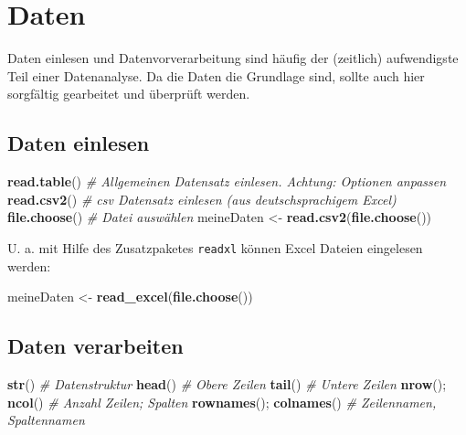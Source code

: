 \documentclass[12pt,ngerman,paper=a4,pagesize,DIV=13]{scrreprt}
\newenvironment{Shaded}{\begin{snugshade}}{\end{snugshade}}
\newcommand{\CommentTok}[1]{\textcolor[rgb]{0.56,0.35,0.01}{\textit{#1}}}
\newcommand{\KeywordTok}[1]{\textcolor[rgb]{0.13,0.29,0.53}{\textbf{#1}}}
\newcommand{\NormalTok}[1]{#1}
\newcommand{\StringTok}[1]{\textcolor[rgb]{0.31,0.60,0.02}{#1}}
\begin{document}
\hypertarget{daten}{%
\section{Daten}\label{daten}}

Daten einlesen und Datenvorverarbeitung sind häufig der (zeitlich)
aufwendigste Teil einer Datenanalyse. Da die Daten die Grundlage sind,
sollte auch hier sorgfältig gearbeitet und überprüft werden.

\hypertarget{daten-einlesen}{%
\subsection{Daten einlesen}\label{daten-einlesen}}

\begin{Shaded}
\begin{Highlighting}[]
\KeywordTok{read.table}\NormalTok{() }\CommentTok{# Allgemeinen Datensatz einlesen. Achtung: Optionen anpassen}
\KeywordTok{read.csv2}\NormalTok{() }\CommentTok{# csv Datensatz einlesen (aus deutschsprachigem Excel)}
\KeywordTok{file.choose}\NormalTok{() }\CommentTok{# Datei auswählen}
\NormalTok{meineDaten <-}\StringTok{ }\KeywordTok{read.csv2}\NormalTok{(}\KeywordTok{file.choose}\NormalTok{())}
\end{Highlighting}
\end{Shaded}

U. a. mit Hilfe des Zusatzpaketes \texttt{readxl} können Excel Dateien
eingelesen werden:

\begin{Shaded}
\begin{Highlighting}[]
\NormalTok{meineDaten <-}\StringTok{ }\KeywordTok{read_excel}\NormalTok{(}\KeywordTok{file.choose}\NormalTok{()) }
\end{Highlighting}
\end{Shaded}

\hypertarget{daten-verarbeiten}{%
\subsection{Daten verarbeiten}\label{daten-verarbeiten}}

\begin{Shaded}
\begin{Highlighting}[]
\KeywordTok{str}\NormalTok{() }\CommentTok{# Datenstruktur}
\KeywordTok{head}\NormalTok{() }\CommentTok{# Obere Zeilen}
\KeywordTok{tail}\NormalTok{() }\CommentTok{# Untere Zeilen}
\KeywordTok{nrow}\NormalTok{(); }\KeywordTok{ncol}\NormalTok{() }\CommentTok{# Anzahl Zeilen; Spalten }
\KeywordTok{rownames}\NormalTok{(); }\KeywordTok{colnames}\NormalTok{() }\CommentTok{# Zeilennamen, Spaltennamen}
\end{Highlighting}
\end{Shaded}
\end{document}
